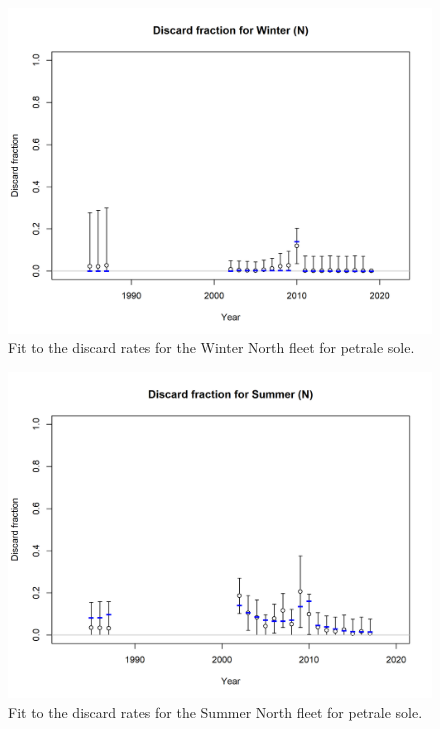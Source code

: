 \documentclass[12pt,]{article}
\begin{document}
\FloatBarrier

\begin{figure}
\centering
\includegraphics{r4ss/plots_mod1/discard_fitWinter (N).png}
\caption{Fit to the discard rates for the Winter North fleet for petrale
sole. \label{fig:fit_wn_discard}}
\end{figure}

\FloatBarrier

\begin{figure}
\centering
\includegraphics{r4ss/plots_mod1/discard_fitSummer (N).png}
\caption{Fit to the discard rates for the Summer North fleet for petrale
sole. \label{fig:fit_sn_discard}}
\end{figure}
\end{document}
